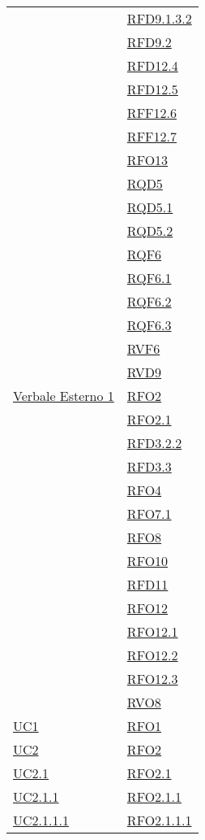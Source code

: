 \begin{longtable}{|>{\centering}m{5cm}|m{5cm}<{\centering}|}
& \hyperlink{RFD9.1.3.2}{RFD9.1.3.2}\\
& \hyperlink{RFD9.2}{RFD9.2}\\
& \hyperlink{RFD12.4}{RFD12.4}\\
& \hyperlink{RFD12.5}{RFD12.5}\\
& \hyperlink{RFF12.6}{RFF12.6}\\
& \hyperlink{RFF12.7}{RFF12.7}\\
& \hyperlink{RFO13}{RFO13}\\
& \hyperlink{RQD5}{RQD5}\\
& \hyperlink{RQD5.1}{RQD5.1}\\
& \hyperlink{RQD5.2}{RQD5.2}\\
& \hyperlink{RQF6}{RQF6}\\
& \hyperlink{RQF6.1}{RQF6.1}\\
& \hyperlink{RQF6.2}{RQF6.2}\\
& \hyperlink{RQF6.3}{RQF6.3}\\
& \hyperlink{RVF6}{RVF6}\\
& \hyperlink{RVD9}{RVD9}\\ \hline
\hyperlink{Verbale Esterno 1}{Verbale Esterno 1} & \hyperlink{RFO2}{RFO2}\\
& \hyperlink{RFO2.1}{RFO2.1}\\
& \hyperlink{RFD3.2.2}{RFD3.2.2}\\
& \hyperlink{RFD3.3}{RFD3.3}\\
& \hyperlink{RFO4}{RFO4}\\
& \hyperlink{RFO7.1}{RFO7.1}\\
& \hyperlink{RFO8}{RFO8}\\
& \hyperlink{RFO10}{RFO10}\\
& \hyperlink{RFD11}{RFD11}\\
& \hyperlink{RFO12}{RFO12}\\
& \hyperlink{RFO12.1}{RFO12.1}\\
& \hyperlink{RFO12.2}{RFO12.2}\\
& \hyperlink{RFO12.3}{RFO12.3}\\
& \hyperlink{RVO8}{RVO8}\\ \hline
\hyperref[UC1]{UC1} & \hyperlink{RFO1}{RFO1}\\ \hline
\hyperref[UC2]{UC2} & \hyperlink{RFO2}{RFO2}\\ \hline
\hyperref[UC2.1]{UC2.1} & \hyperlink{RFO2.1}{RFO2.1}\\ \hline
\hyperref[UC2.1.1]{UC2.1.1} & \hyperlink{RFO2.1.1}{RFO2.1.1}\\ \hline
\hyperref[UC2.1.1.1]{UC2.1.1.1} & \hyperlink{RFO2.1.1.1}{RFO2.1.1.1}\\ \hline

\end{longtable}
